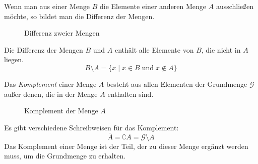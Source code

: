 \begin{regel}[Mengendifferenz]
Wenn man aus einer Menge \(B\) die Elemente einer anderen Menge \(A\) ausschließen möchte, so bildet man die Differenz der Mengen.

 \begin{figure}
  \begin{center}
  \end{center}
  \caption{Differenz zweier Mengen}
 \end{figure}
 
 Die Differenz der Mengen \(B\) und \(A\) enthält alle Elemente von \(B\), die nicht in \(A\) liegen.
 \begin{equation*}
  B\setminus A = \lbrace x\mid x\in B\;\text{und}\; x\not\in A \rbrace
 \end{equation*}

\end{regel}

\begin{defi}[Komplement]
Das \emph{Komplement} einer Menge \(A\) besteht aus allen Elementen der Grundmenge \(\mathcal{G}\) außer denen, die in der Menge \(A\) enthalten sind.
 \begin{figure}
  \begin{center}
  \end{center}
  \caption{Komplement der Menge \(A\)}
 \end{figure}
 Es gibt verschiedene Schreibweisen für das Komplement: 
 \begin{equation*}
  \overline{A} = \complement A = \mathcal{G}\setminus A
 \end{equation*}
Das Komplement einer Menge ist der Teil, der zu dieser Menge ergänzt werden muss, um die Grundmenge zu erhalten.
\end{defi}

